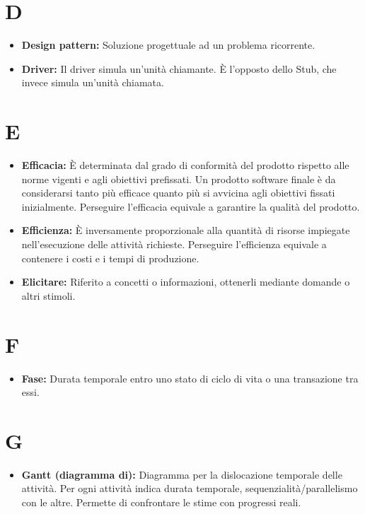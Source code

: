 \documentclass[a4paper]{article}
\begin{document}
	\section{D}
		\begin{itemize}
			\item \textbf{Design pattern:} Soluzione progettuale ad un problema ricorrente. 
			\item \textbf{Driver:} Il driver simula un'unità chiamante. È l'opposto dello Stub, che invece simula un'unità chiamata.
		\end{itemize}
	\section{E}
		\begin{itemize}
			\item \textbf{Efficacia:} È determinata dal grado di conformità del prodotto rispetto alle norme vigenti e 
			agli obiettivi prefissati. Un prodotto software finale è da considerarsi tanto più efficace quanto più si 
			avvicina agli obiettivi fissati inizialmente. Perseguire l'efficacia equivale a garantire la qualità del prodotto.
			\item \textbf{Efficienza:} È inversamente proporzionale alla quantità di risorse impiegate nell'esecuzione 
			delle attività richieste. Perseguire l'efficienza equivale a contenere i costi e i tempi di produzione.
			\item \textbf{Elicitare:} Riferito a concetti o informazioni, ottenerli mediante domande o altri stimoli.
		\end{itemize}
		
	\section{F}
		\begin{itemize}
			\item \textbf{Fase:} Durata temporale entro uno stato di ciclo di vita o una transazione tra essi.
		\end{itemize}
		
	\section{G}
		\begin{itemize}
			\item \textbf{Gantt (diagramma di):} Diagramma per la dislocazione temporale delle attività. Per ogni 
			attività indica durata temporale, sequenzialità/parallelismo con le altre. Permette di confrontare le 
			stime con progressi reali.
		\end{itemize}
		
\end{document}
